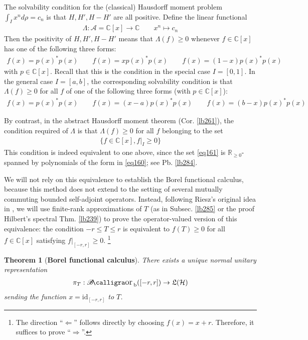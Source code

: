 \documentclass[12pt,b5paper,notitlepage]{article}
\theoremstyle{definition}
\theoremstyle{plain}
\newtheorem{thm}[df]{Theorem}
\DeclareMathOperator{\Borb}{{\mathscr{B}\text{\kern -2pt {\calligra\large or}}\,}_{\mathrm b}}
\newcommand{\fk}{\mathfrak}
\newcommand{\id}{\mathrm{id}}
\newcommand{\scr}{\mathscr}
\newcommand{\Cbb}{\mathbb C}
\newcommand{\Rbb}{\mathbb R}
\newcommand{\MH}{\mathcal H}
\numberwithin{equation}{section}
\begin{document}
The solvability condition for the (classical) Hausdorff moment problem $\int_I x^nd\rho=c_n$ is that $H,H',H-H'$ are all positive. Define the linear functional
\begin{align*}
\Lambda:\scr A=\Cbb[x]\rightarrow\Cbb\qquad x^n\mapsto c_n
\end{align*}
Then the positivity of $H,H',H-H'$ means that $\Lambda(f)\geq0$ whenever $f\in\Cbb[x]$ has one of the following three forms:
\begin{align*}
f(x)=p(x)^*p(x)\qquad f(x)=xp(x)^*p(x)\qquad f(x)=(1-x)p(x)^*p(x)
\end{align*}
with $p\in\Cbb[x]$. Recall that this is the condition in the special case $I=[0,1]$. In the general case $I=[a,b]$, the corresponding solvability condition is that $\Lambda(f)\geq0$ for all $f$ of one of the following three forms (with $p\in\Cbb[x]$):
\begin{align}\label{eq160}
f(x)=p(x)^*p(x)\qquad f(x)=(x-a)p(x)^*p(x)\qquad f(x)=(b-x)p(x)^*p(x)
\end{align}


By contrast, in the abstract Hausdorff moment theorem (Cor. \ref{lb261}), the condition required of $\Lambda$ is that $\Lambda(f)\geq0$ for all $f$ belonging to the set
\begin{align}\label{eq161}
\{f\in\Cbb[x],f|_I\geq0\}
\end{align}
This condition is indeed equivalent to one above, since the set \eqref{eq161} is $\Rbb_{\geq0}$-spanned by polynomials of the form in \eqref{eq160}; see Pb. \ref{lb284}.


We will not rely on this equivalence to establish the Borel functional calculus, because this method does not extend to the setting of several mutually commuting bounded self-adjoint operators. Instead, following Riesz's original idea in \cite{Rie13}, we will use finite-rank approximations of $T$ (as in Subsec. \ref{lb285} or the proof Hilbert's spectral Thm. \ref{lb239}) to  prove the operator-valued version of this equivalence: the condition $-r\leq T\leq r$ is equivalent to $f(T)\geq0$ for all $f\in\Cbb[x]$ satisfying $f|_{[-r,r]}\geq0$. \footnote{The direction ``$\Leftarrow$'' follows directly by choosing $f(x)=x+r$. Therefore, it suffices to prove ``$\Rightarrow$''.}






\begin{thm}[\textbf{Borel functional calculus}]\label{lb283}
There exists a unique normal unitary representation
\begin{align*}
\pi_T:\Borb([-r,r])\rightarrow\fk L(\MH)
\end{align*}
sending the function $x=\id_{[-r,r]}$ to $T$.
\end{thm}
\end{document}
